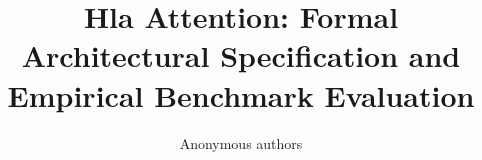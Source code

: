\title{\textbf{Hla Attention: Formal Architectural Specification and Empirical Benchmark Evaluation}}

\author{Anonymous authors}

